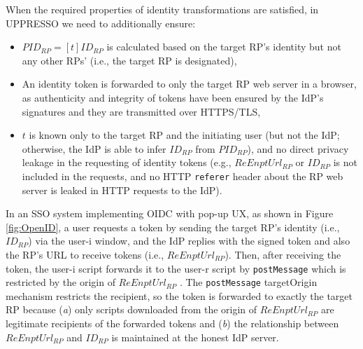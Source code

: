 When the required properties of identity transformations are satisfied,
    in UPPRESSO we need to additionally ensure:
\begin{itemize}
  \item[1.] $PID_{RP} = [t]{ID_{RP}}$ is calculated based on the target RP's identity but not any other RPs' (i.e., the target RP is designated),
  \item[2.]
  An identity token is forwarded to only the target RP web server in a browser,
    as authenticity and integrity of tokens have been ensured by the IdP's signatures
        and they are transmitted over HTTPS/TLS, %
\item[3.] 
$t$ is known only to the target RP and the initiating user (but not the IdP; otherwise, the IdP is able to infer $ID_{RP}$ from $PID_{RP}$),
and no direct privacy leakage in the requesting of identity tokens
(e.g., $ReEnptUrl_{RP}$ or $ID_{RP}$ is not included in the requests,
and no HTTP \texttt{referer} header about the RP web server is leaked in HTTP requests to the IdP).
\end{itemize}

In an SSO system implementing OIDC with pop-up UX, as shown in Figure \ref{fig:OpenID},
    a user requests a token by sending the target RP's identity (i.e., $ID_{RP}$) via the user-i window,
    and the IdP replies with the signed token and also the RP's URL to receive tokens (i.e., $ReEnptUrl_{RP}$).
Then, after receiving the token, the user-i script forwards it to the user-r script by \verb+postMessage+
    which is restricted by the origin of $ReEnptUrl_{RP}$ \cite{SPRESSO,MITREid,BrowserID,GoogleIdIntegrate,de2014oauth,OpenIDConnect}.
The \verb+postMessage+ targetOrigin mechanism \cite{postm-targeto} restricts the recipient,
    so the token is forwarded to exactly the target RP because (\emph{a}) only scripts downloaded from the origin of $ReEnptUrl_{RP}$ are legitimate recipients of the forwarded tokens
    and (\emph{b}) the relationship between $ReEnptUrl_{RP}$ and $ID_{RP}$ is maintained at the honest IdP server.

